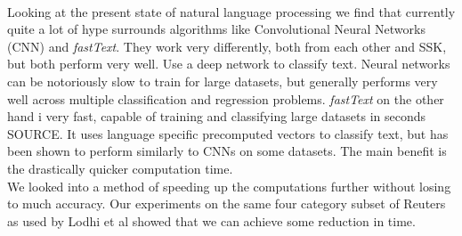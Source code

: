 \\
Looking at the present state of natural language processing we find that currently quite a lot of hype surrounds algorithms like Convolutional Neural Networks (CNN) and \textit{fastText}. They work very differently, both from each other and SSK, but both perform very well. Use a deep network to classify text. Neural networks can be notoriously slow to train for large datasets, but generally performs very well across multiple classification and regression problems. \textit{fastText} on the other hand i very fast, capable of training and classifying large datasets in seconds SOURCE. It uses language specific precomputed vectors to classify text, but has been shown to perform similarly to CNNs on some datasets. The main benefit is the drastically quicker computation time.
\\
We looked into a method of speeding up the computations further without losing to much accuracy. Our experiments on the same four category subset of Reuters as used by Lodhi et al showed that we can achieve some reduction in time.
